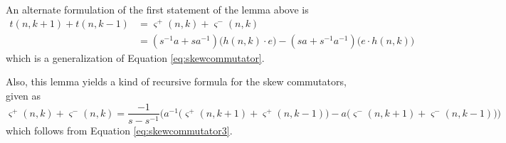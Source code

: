 \begin{remark}
An alternate formulation of the first statement of the lemma above is
\begin{equation} \label{eq:skewcommutator2}
\begin{split}
t(n, k+1) + t(n, k-1) & = \varsigma^+ (n, k) + \varsigma^- (n, k) \\
& = ( s^{-1} a + s a^{-1} ) \big( h(n, k) \cdot e \big) - ( s a + s^{-1} a^{-1} ) \big( e \cdot h(n, k) \big)
\end{split}
\end{equation}
which is a generalization of Equation \eqref{eq:skewcommutator}. 

Also, this lemma yields a kind of recursive formula for the skew commutators, given as
\begin{equation} \label{eq:skewcommutators2}
\varsigma^+ (n, k) + \varsigma^- (n, k) = \frac{-1}{s-s^{-1}} \Big( a^{-1} \big( \varsigma^+(n, k+1) + \varsigma^+(n, k-1) \big) - a \big( \varsigma^-(n, k+1) + \varsigma^-(n, k-1) \big) \Big)
\end{equation}
which follows from Equation \eqref{eq:skewcommutator3}.
\end{remark}

